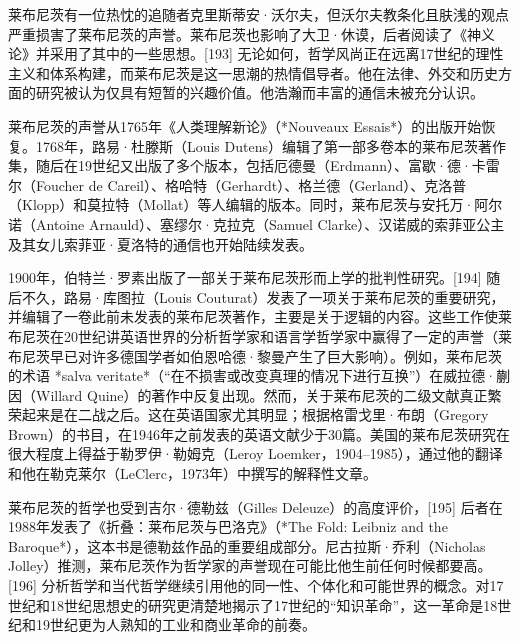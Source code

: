 莱布尼茨有一位热忱的追随者克里斯蒂安·沃尔夫，但沃尔夫教条化且肤浅的观点严重损害了莱布尼茨的声誉。莱布尼茨也影响了大卫·休谟，后者阅读了《神义论》并采用了其中的一些思想。[193] 无论如何，哲学风尚正在远离17世纪的理性主义和体系构建，而莱布尼茨是这一思潮的热情倡导者。他在法律、外交和历史方面的研究被认为仅具有短暂的兴趣价值。他浩瀚而丰富的通信未被充分认识。

莱布尼茨的声誉从1765年《人类理解新论》（*Nouveaux Essais*）的出版开始恢复。1768年，路易·杜滕斯（Louis Dutens）编辑了第一部多卷本的莱布尼茨著作集，随后在19世纪又出版了多个版本，包括厄德曼（Erdmann）、富歇·德·卡雷尔（Foucher de Careil）、格哈特（Gerhardt）、格兰德（Gerland）、克洛普（Klopp）和莫拉特（Mollat）等人编辑的版本。同时，莱布尼茨与安托万·阿尔诺（Antoine Arnauld）、塞缪尔·克拉克（Samuel Clarke）、汉诺威的索菲亚公主及其女儿索菲亚·夏洛特的通信也开始陆续发表。

1900年，伯特兰·罗素出版了一部关于莱布尼茨形而上学的批判性研究。[194] 随后不久，路易·库图拉（Louis Couturat）发表了一项关于莱布尼茨的重要研究，并编辑了一卷此前未发表的莱布尼茨著作，主要是关于逻辑的内容。这些工作使莱布尼茨在20世纪讲英语世界的分析哲学家和语言学哲学家中赢得了一定的声誉（莱布尼茨早已对许多德国学者如伯恩哈德·黎曼产生了巨大影响）。例如，莱布尼茨的术语 *salva veritate*（“在不损害或改变真理的情况下进行互换”）在威拉德·蒯因（Willard Quine）的著作中反复出现。然而，关于莱布尼茨的二级文献真正繁荣起来是在二战之后。这在英语国家尤其明显；根据格雷戈里·布朗（Gregory Brown）的书目，在1946年之前发表的英语文献少于30篇。美国的莱布尼茨研究在很大程度上得益于勒罗伊·勒姆克（Leroy Loemker，1904–1985），通过他的翻译和他在勒克莱尔（LeClerc，1973年）中撰写的解释性文章。

莱布尼茨的哲学也受到吉尔·德勒兹（Gilles Deleuze）的高度评价，[195] 后者在1988年发表了《折叠：莱布尼茨与巴洛克》（*The Fold: Leibniz and the Baroque*），这本书是德勒兹作品的重要组成部分。尼古拉斯·乔利（Nicholas Jolley）推测，莱布尼茨作为哲学家的声誉现在可能比他生前任何时候都要高。[196] 分析哲学和当代哲学继续引用他的同一性、个体化和可能世界的概念。对17世纪和18世纪思想史的研究更清楚地揭示了17世纪的“知识革命”，这一革命是18世纪和19世纪更为人熟知的工业和商业革命的前奏。

